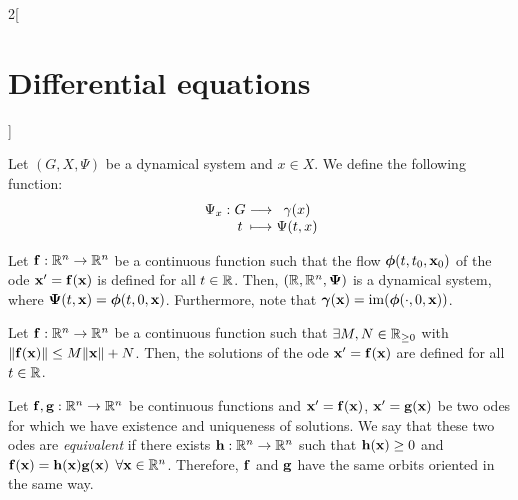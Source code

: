 \documentclass[../../../main.tex]{subfiles}
\begin{document}
\begin{multicols}{2}[\section{Differential equations}]
\begin{definition}
  \end{definition}
  \begin{center}
    \begin{minipage}[b]{0.475\linewidth}
      \centering
      
    \end{minipage}\hfill
    \begin{minipage}[b]{0.475\linewidth}
      \centering
      
    \end{minipage}
  \end{center}
  \begin{center}
    \begin{minipage}{\linewidth}
      \centering
      
    \end{minipage}
  \end{center}
  \begin{definition}
    Let $(G,X,\Psi)$ be a dynamical system and $x\in X$. We define the following function: $$\function{\Psi_x}{G}{\gamma(x)}{t}{\Psi(t,x)}$$
  \end{definition}
  \begin{lemma}
    Let $\boldsymbol{\mathrm{f}}:\mathbb{R}^n\rightarrow\mathbb{R}^n$ be a continuous function such that the flow $\boldsymbol{\mathrm{\phi}}(t,t_0,\boldsymbol{\mathrm{x}}_0)$ of the ode $\boldsymbol{\mathrm{x}}' =\boldsymbol{\mathrm{f}}(\boldsymbol{\mathrm{x}})$ is defined for all $t\in\mathbb{R}$. Then, $(\mathbb{R},\mathbb{R}^n,\boldsymbol{\mathrm{\Psi}})$ is a dynamical system, where $\boldsymbol{\mathrm{\Psi}}(t,\boldsymbol{\mathrm{x}})=\boldsymbol{\mathrm{\phi}}(t,0,\boldsymbol{\mathrm{x}})$. Furthermore, note that $\boldsymbol{\mathrm{\gamma}}(\boldsymbol{\mathrm{x}})=\operatorname{im}(\boldsymbol{\mathrm{\phi}}(\cdot,0,\boldsymbol{\mathrm{x}}))$.
  \end{lemma}
  \begin{lemma}
    Let $\boldsymbol{\mathrm{f}}:\mathbb{R}^n\rightarrow\mathbb{R}^n$ be a continuous function such that $\exists M,N\in\mathbb{R}_{\geq 0}$ with $\|\boldsymbol{\mathrm{f}}(\boldsymbol{\mathrm{x}})\|\leq M\|\boldsymbol{\mathrm{x}}\|+N$. Then, the solutions of the ode $\boldsymbol{\mathrm{x}}' =\boldsymbol{\mathrm{f}}(\boldsymbol{\mathrm{x}})$ are defined for all $t\in\mathbb{R}$.
  \end{lemma}
  \begin{definition}
    Let $\boldsymbol{\mathrm{f}},\boldsymbol{\mathrm{g}}:\mathbb{R}^n\rightarrow\mathbb{R}^n$ be continuous functions and $\boldsymbol{\mathrm{x}}' =\boldsymbol{\mathrm{f}}(\boldsymbol{\mathrm{x}})$, $\boldsymbol{\mathrm{x}}' =\boldsymbol{\mathrm{g}}(\boldsymbol{\mathrm{x}})$ be two odes for which we have existence and uniqueness of solutions. We say that these two odes are \emph{equivalent} if there exists $\boldsymbol{\mathrm{h}}:\mathbb{R}^n\rightarrow\mathbb{R}^n$ such that $\boldsymbol{\mathrm{h}}(\boldsymbol{\mathrm{x}})\geq 0$ and $\boldsymbol{\mathrm{f}}(\boldsymbol{\mathrm{x}})=\boldsymbol{\mathrm{h}}(\boldsymbol{\mathrm{x}})\boldsymbol{\mathrm{g}}(\boldsymbol{\mathrm{x}})$ $\forall \boldsymbol{\mathrm{x}}\in\mathbb{R}^n$. Therefore, $\boldsymbol{\mathrm{f}}$ and $\boldsymbol{\mathrm{g}}$ have the same orbits oriented in the same way.

\end{definition}
\end{multicols}
\end{document}
